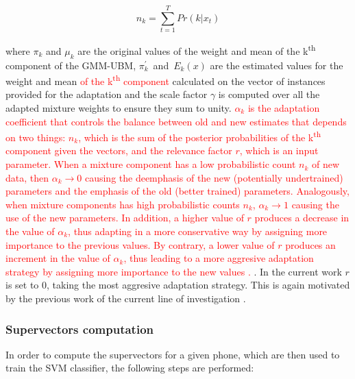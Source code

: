 \begin{equation}
  n_{k} = \sum_{t=1}^{T} Pr(k|x_{t})
\end{equation}

where $\pi_{k}$ and $\mu_{k}$ are the original values of the weight and mean of the
k\textsuperscript{th} component of the GMM-UBM, \mbox{$\pi_{k}^{'}$ and $E_{k}(x)$} are
the estimated values for the weight and mean
\textcolor{red}{of the k\textsuperscript{th} component}
calculated on the vector of instances provided
for the adaptation and the scale factor $\gamma$ is computed over all the
adapted mixture weights to ensure they sum to unity. \textcolor{red}{
  $\alpha_{k}$ is the adaptation
  coefficient that controls the balance between old and new estimates that depends on
  two things: $n_{k}$, which is the sum of the posterior probabilities
  of the k\textsuperscript{th} component given the vectors, and
  the relevance factor $r$, which is an input parameter.
  When a mixture component has a low probabilistic count $n_{k}$ of new data, then
  $\alpha_{k} \to 0$ causing the deemphasis of the new (potentially undertrained) parameters
  and the emphasis of the old (better trained) parameters. Analogously,
  when mixture components has
  high probabilistic counts $n_{k}$, $\alpha_{k} \to 1$ causing the use of the new parameters.
  In addition, a higher value of $r$ produces a decrease in the value
  of $\alpha_{k}$, thus adapting in a more conservative way by assigning more importance
  to the previous values. By contrary, a lower value of $r$ produces an increment in the value
  of $\alpha_{k}$, thus leading to a more aggresive adaptation strategy by assigning more importance
  to the new values \textcolor{red}{\cite{ubm_adaptation}}.
}. In the current work $r$ is set to 0, taking the most aggresive
adaptation strategy. This is again motivated by the previous work of the current
line of investigation \cite{main}.

\subsubsection{Supervectors computation}

In order to compute the supervectors for a given phone, which are then used to train the SVM
classifier, the following steps are performed:

